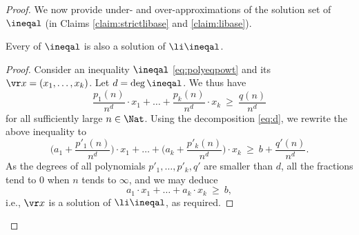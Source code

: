 \begin{proof}
We now provide under- and over-approximations
of the solution set of $\ineqal$ (in Claims \ref{claim:strictlibase} and \ref{claim:libase}).

\begin{claim} \label{claim:libase}
Every \aasol of $\ineqal$ is also a solution of $\li \ineqal$.
\end{claim}
\begin{proof}
%
Consider an inequality $\ineqal$ \eqref{eq:polyeqpowt}
and  its \aasol  $\vr x = (x_1, \ldots, x_k)$.
Let $d = \deg \ineqal$.
We thus have
\[
\frac{p_1(n)}{n^d} \cdot x_1 + \ldots + \frac{p_k(n)}{n^d} \cdot x_k \ \geq \ \frac{q(n)}{n^d}
\]
for all sufficiently large $n\in\Nat$. 
Using the decomposition \eqref{eq:d}, we rewrite the above inequality to
\[
\Big(a_1 + \frac{p'_1(n)}{n^d}\Big) \cdot x_1 + \ldots + 
\Big(a_k + \frac{p'_k(n)}{n^d} \Big) \cdot x_k \ \geq \ 
b + \frac{q'(n)}{n^d}.
\]
As the degrees of all polynomials $p'_1, \ldots, p'_k, q'$ are smaller than $d$, 
all the fractions tend to 0 when $n$ tends to $\infty$, and we may deduce
\[
a_1 \cdot x_1 + \ldots + a_k \cdot x_k \ \geq \  b,
\]
i.e., $\vr x$ is a solution of $\li \ineqal$, as required.
%
\end{proof}


\end{proof}
